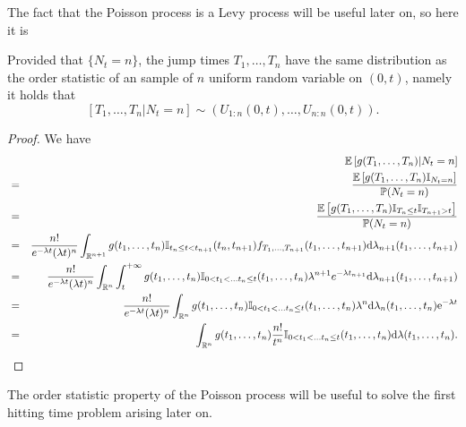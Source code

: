 The fact that the Poisson process is a Levy process will be useful later on, so here it is
\begin{prop}
Provided that $\{N_t=n\}$, the jump times $T_1,\ldots,T_n$ have the same distribution as the order statistic of an \iid sample of $n$ uniform random variable on $(0,t)$, namely it holds that
$$
[T_1,\ldots,T_n|N_t=n]\sim \left(U_{1:n}(0,t),\ldots, U_{n:n}(0,t)\right).
$$
\end{prop}
\begin{proof}
We have
\begin{eqnarray*}
&&\mathbb{E}\left[g(T_1,\ldots, T_n)|N_t = n\right]\\
&=&\frac{\mathbb{E}\left[g(T_1,\ldots, T_n)\mathbb{I}_{N_t = n}\right]}{\mathbb{P}(N_t = n)}\\
&=&\frac{\mathbb{E}\left[g(T_1,\ldots, T_n)\mathbb{I}_{T_n \leq t}\mathbb{I}_{T_{n+1} > t}\right]}{\mathbb{P}(N_t = n)}\\
&=&\frac{n!}{e^{-\lambda t}(\lambda t)^n}\int_{\mathbb{R}^{n+1}}g(t_1,\ldots, t_n)\mathbb{I}_{t_n\leq t<t_{n+1}}(t_n,t_{n+1})f_{T_1,\ldots, T_{n+1}}(t_1,\ldots, t_{n+1})\text{d}\lambda_{n+1}(t_1,\ldots, t_{n+1})\\
&=&\frac{n!}{e^{-\lambda t}(\lambda t)^n}\int_{\mathbb{R}^{n}}\int_{t}^{+\infty}g(t_1,\ldots, t_n)\mathbb{I}_{0<t_1<\ldots t_n\leq t}(t_1,\ldots,t_{n})\lambda^{n+1} e^{-\lambda t_{n+1}}\text{d}\lambda_{n+1}(t_1,\ldots, t_{n+1})\\
&=&\frac{n!}{e^{-\lambda t}(\lambda t)^n}\int_{\mathbb{R}^{n}}g(t_1,\ldots, t_n)\mathbb{I}_{0<t_1<\ldots t_n\leq t}(t_1,\ldots,t_{n})\lambda^{n} \text{d}\lambda_{n}(t_1,\ldots,t_n)\mathrm{e}^{-\lambda t}\\
&=&\int_{\mathbb{R}^{n}}g(t_1,\ldots, t_n)\frac{n!}{t^n}\mathbb{I}_{0<t_1<\ldots t_n\leq t}(t_1,\ldots,t_{n})\text{d}\lambda(t_1,\ldots,t_{n} ).
\end{eqnarray*}
\end{proof}
\noindent The order statistic property of the Poisson process will be useful to solve the first hitting time problem arising later on. 


